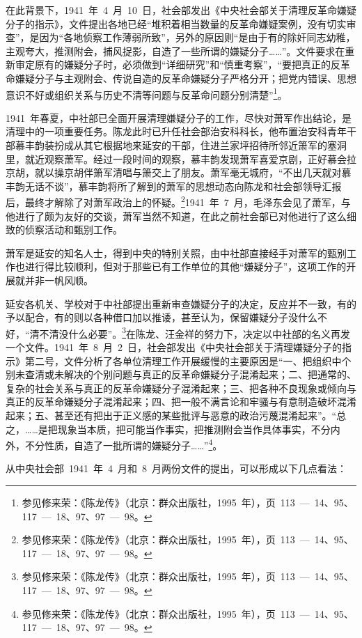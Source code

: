 在此背景下，1941~年~4~月~10~日，社会部发出《中央社会部关于清理反革命嫌疑分子的指示》，文件提出各地已经“堆积着相当数量的反革命嫌疑案例，没有切实审查”，是因为“各地侦察工作薄弱所致”，另外的原因则“是由于有的除奸同志幼稚，主观夸大，推测附会，捕风捉影，自造了一些所谓的嫌疑分子……”。文件要求在重新审定原有的嫌疑分子时，必须做到“详细研究”和“慎重考察”，“要把真正的反革命嫌疑分子与主观附会、传说自造的反革命嫌疑分子严格分开；把党内错误、思想意识不好或组织关系与历史不清等问题与反革命问题分别清楚”\footnote{参见修来荣：《陈龙传》（北京：群众出版社，1995~年），页~113~—~14、95、117~—~18、97、97~—~98。}。

1941~年春夏，中社部已全面开展清理嫌疑分子的工作，尽快对萧军作出结论，是清理中的一项重要任务。陈龙此时已升任社会部治安科科长，他布置治安科青年干部慕丰韵装扮成从其它根据地来延安的干部，住进兰家坪招待所邻近箫军的塞洞里，就近观察萧军。经过一段时间的观察，慕丰韵发现萧军喜爱京剧，正好慕会拉京胡，就以操京胡伴箫军清唱与箫交上了朋友。萧军毫无城府，“不出几天就对慕丰韵无话不谈”，慕丰韵将所了解到的萧军的思想动态向陈龙和社会部领导汇报后，最终才解除了对萧军政治上的怀疑。\footnote{参见修来荣：《陈龙传》（北京：群众出版社，1995~年），页~113~—~14、95、117~—~18、97、97~—~98。}1941~年~7~月，毛泽东会见了萧军，与他进行了颇为友好的交谈，萧军当然不知道，在此之前社会部已对他进行了这么细致的侦察活动和甄别工作。

萧军是延安的知名人士，得到中央的特别关照，由中社部直接经手对萧军的甄别工作也进行得比较顺利，但对于那些已有工作单位的其他“嫌疑分子”，这项工作的开展就并非一帆风顺。

延安各机关、学校对于中社部提出重新审查嫌疑分子的决定，反应并不一致，有的予以配合，有的则以各种借口加以推诿，甚至认为，保留嫌疑分子没什么不好，“清不清没什么必要”。\footnote{参见修来荣：《陈龙传》（北京：群众出版社，1995~年），页~113~—~14、95、117~—~18、97、97~—~98。}在陈龙、汪金祥的努力下，决定以中社部的名义再发一个文件。1941~年~8~月~2~日，社会部发出《中央社会部关于清理嫌疑分子的指示》第二号，文件分析了各单位清理工作开展缓慢的主要原因是“一、把组织中个别未查清或未解决的个别问题与真正的反革命嫌疑分子混淆起来；二、把通常的、复杂的社会关系与真正的反革命嫌疑分子混淆起来；三、把各种不良现象或倾向与真正的反革命嫌疑分子混淆起来；四、把一般不满言论和牢骚与有意制造破坏混淆起来；五、甚至还有把出于正义感的某些批评与恶意的政治污蔑混淆起来”。“总之，……是把现象当本质，把可能当作事实，把推测附会当作具体事实，不分内外，不分性质，自造了一批所谓的嫌疑分子……”\footnote{参见修来荣：《陈龙传》（北京：群众出版社，1995~年），页~113~—~14、95、117~—~18、97、97~—~98。}。

从中央社会部~1941~年~4~月和~8~月两份文件的提出，可以形成以下几点看法：

